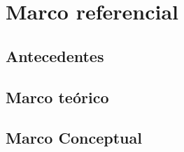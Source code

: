\chapter{Marco referencial}
\section{Antecedentes}
\section{Marco teórico}
\section{Marco Conceptual}
